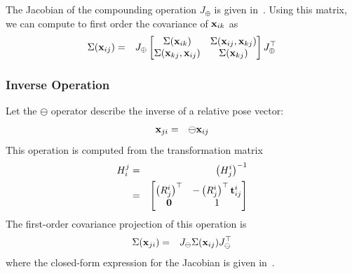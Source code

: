 \documentclass[conference]{IEEEtran}
\begin{document}

The Jacobian of the compounding operation $J_\oplus$ is given
in~\cite{reustice-phdthesis}.  Using this matrix, we can compute to
first order the covariance of ${\bf x}_{ik}$ as
\begin{eqnarray*}
  \Sigma({\bf x}_{ij}) & = & J_\oplus \begin{bmatrix}
    \Sigma({\bf x}_{ik}) & \Sigma({\bf x}_{ij}, {\bf x}_{kj})\\
    \Sigma({\bf x}_{kj}, {\bf x}_{ij}) & \Sigma({\bf x}_{kj})\\
  \end{bmatrix} J_\oplus^\top
\end{eqnarray*}

\subsubsection{Inverse Operation}
\label{sub:inverseoperation}
Let the $\ominus$ operator describe the inverse of a relative pose
vector:
\begin{eqnarray*}
  {\bf x}_{ji} & = & \ominus {\bf x}_{ij}
\end{eqnarray*}
This operation is computed from the transformation matrix
\begin{eqnarray*}
  H_i^j & = & \left(H_j^i\right)^{-1} \\
  & = & \begin{bmatrix}
    \left( R_j^i \right)^\top & -\left( R_j^i \right)^\top {\bf t}_{ij}^i\\
    {\bf 0} & 1
  \end{bmatrix}
\end{eqnarray*}
The first-order covariance projection of this operation is
\begin{eqnarray*}
  \Sigma({\bf x}_{ji}) & = & J_\ominus \Sigma({\bf x}_{ij}) J_\ominus^\top
\end{eqnarray*}
where the closed-form expression for the Jacobian is given
in~\cite{reustice-phdthesis}.
\end{document}
